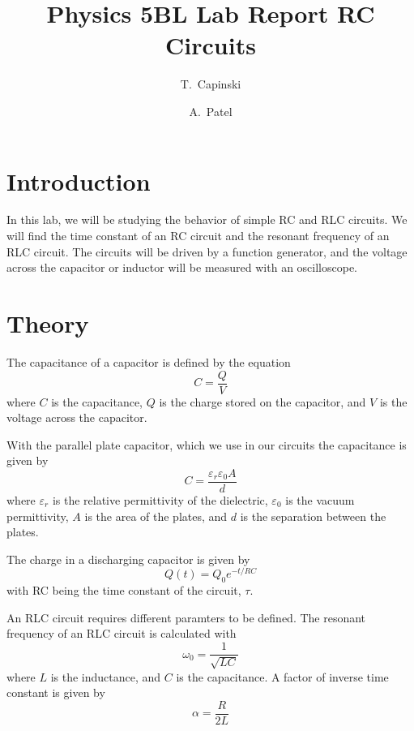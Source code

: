 \documentclass[11pt]{article}
\title{Physics 5BL Lab Report RC Circuits}
\author{T.~Capinski \and A.~Patel}
\let\oldsection\section
\renewcommand\section{\clearpage\oldsection}
\begin{document}
    \maketitle
    \tableofcontents

    \section*{Introduction}\label{sec:introduction}

    In this lab, we will be studying the behavior of simple RC and RLC circuits.
    We will find the time constant of an RC circuit and the resonant frequency of an RLC circuit.
    The circuits will be driven by a function generator, and the voltage across the capacitor or inductor will be measured with an oscilloscope.

    \section*{Theory}\label{sec:theory}

    The capacitance of a capacitor is defined by the equation
    \begin{equation}
        C = \frac{Q}{V}
    \end{equation}\label{eq:capacitance}
    where $C$ is the capacitance, $Q$ is the charge stored on the capacitor, and $V$ is the voltage across the capacitor.

    With the parallel plate capacitor, which we use in our circuits the capacitance is given by
    \begin{equation}
        C = \frac{\varepsilon_r \varepsilon_0 A}{d}
    \end{equation}\label{eq:parallel-plate-capacitance}
    where $\varepsilon_r$ is the relative permittivity of the dielectric, $\varepsilon_0$ is the vacuum permittivity, $A$ is the area of the plates, and $d$ is the separation between the plates.

    The charge in a discharging capacitor is given by
    \begin{equation}
        Q(t) = Q_0 e^{-t/RC}
    \end{equation}\label{eq:discharging-capacitor}
    with RC being the time constant of the circuit, $\tau$.

    An RLC circuit requires different paramters to be defined.
    The resonant frequency of an RLC circuit is calculated with
    \begin{equation}
        \omega_0 = \frac{1}{\sqrt{LC}}
    \end{equation}\label{eq:omega-0}
    where $L$ is the inductance, and $C$ is the capacitance.
    A factor of inverse time constant is given by
    \begin{equation}
        \alpha = \frac{R}{2L}
    \end{equation}\label{eq:alpha}
\end{document}
